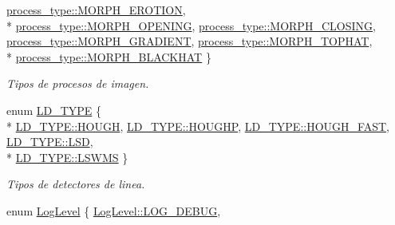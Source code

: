 \begin{DoxyCompactItemize}
\hyperlink{group___img_proc_ggaa7be5aaaa0e9ec5885c5bd72f41dad47ad8e41fdfaeb278c77596eb6a3c8e0f04}{process\+\_\+type\+::\+M\+O\+R\+P\+H\+\_\+\+E\+R\+O\+T\+I\+ON}, 
\\*
\hyperlink{group___img_proc_ggaa7be5aaaa0e9ec5885c5bd72f41dad47a11d7095a94eea40bb9860b9e0b09c23d}{process\+\_\+type\+::\+M\+O\+R\+P\+H\+\_\+\+O\+P\+E\+N\+I\+NG}, 
\hyperlink{group___img_proc_ggaa7be5aaaa0e9ec5885c5bd72f41dad47a622378b015185b105eef552549a5cf92}{process\+\_\+type\+::\+M\+O\+R\+P\+H\+\_\+\+C\+L\+O\+S\+I\+NG}, 
\hyperlink{group___img_proc_ggaa7be5aaaa0e9ec5885c5bd72f41dad47ad9bd47a1f0c0b296e5db72dc9801b8e6}{process\+\_\+type\+::\+M\+O\+R\+P\+H\+\_\+\+G\+R\+A\+D\+I\+E\+NT}, 
\hyperlink{group___img_proc_ggaa7be5aaaa0e9ec5885c5bd72f41dad47a791ac3ec759e1234cb61e8df76dd15e3}{process\+\_\+type\+::\+M\+O\+R\+P\+H\+\_\+\+T\+O\+P\+H\+AT}, 
\\*
\hyperlink{group___img_proc_ggaa7be5aaaa0e9ec5885c5bd72f41dad47abab238f32734ecfb0155ddec17535fd7}{process\+\_\+type\+::\+M\+O\+R\+P\+H\+\_\+\+B\+L\+A\+C\+K\+H\+AT}
 \}\begin{DoxyCompactList}\small\item\em Tipos de procesos de imagen. \end{DoxyCompactList}
\item 
enum \hyperlink{namespace_i3_d_ac3913218d62e4e56ed38931636256ae2}{L\+D\+\_\+\+T\+Y\+PE} \{ \\*
\hyperlink{namespace_i3_d_ac3913218d62e4e56ed38931636256ae2a41a5c14aad6090eacf08b98adde1fb0b}{L\+D\+\_\+\+T\+Y\+P\+E\+::\+H\+O\+U\+GH}, 
\hyperlink{namespace_i3_d_ac3913218d62e4e56ed38931636256ae2acd4e263040872b9246dbf5db76c7c78b}{L\+D\+\_\+\+T\+Y\+P\+E\+::\+H\+O\+U\+G\+HP}, 
\hyperlink{namespace_i3_d_ac3913218d62e4e56ed38931636256ae2abbd84f1fdcbb350f37a2d90ce8c70e1a}{L\+D\+\_\+\+T\+Y\+P\+E\+::\+H\+O\+U\+G\+H\+\_\+\+F\+A\+ST}, 
\hyperlink{namespace_i3_d_ac3913218d62e4e56ed38931636256ae2acccf51b3cb3320e8dd936bd1bb473a3e}{L\+D\+\_\+\+T\+Y\+P\+E\+::\+L\+SD}, 
\\*
\hyperlink{namespace_i3_d_ac3913218d62e4e56ed38931636256ae2a9da21fc303d83db9512f83db24b8b648}{L\+D\+\_\+\+T\+Y\+P\+E\+::\+L\+S\+W\+MS}
 \}\begin{DoxyCompactList}\small\item\em Tipos de detectores de linea. \end{DoxyCompactList}
\item 
enum \hyperlink{namespace_i3_d_ae1af0f2e3b629610c45222809ff521f6}{Log\+Level} \{ \hyperlink{namespace_i3_d_ae1af0f2e3b629610c45222809ff521f6aeded50d942c7c2d37d09ba8241ff017f}{Log\+Level\+::\+L\+O\+G\+\_\+\+D\+E\+B\+UG}, 

\end{DoxyCompactItemize}
